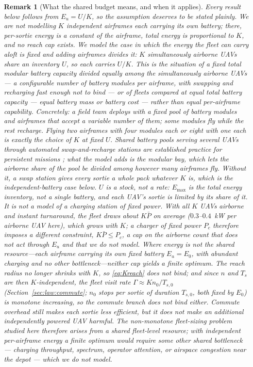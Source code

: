 \documentclass[journal,outdir=./]{IEEEtran}
\newtheorem{remark}{Remark}
\newcommand{\Pbar}{\bar{P}}
\newcommand{\Emax}{E_{\max}}
\newcommand{\Eu}{E_{u}}
\newcommand{\Gam}{\Gamma}
\begin{document}
\begin{remark}[What the shared budget means, and when it applies]\label{rem:budget}
Every result below follows from $\Eu=U/K$, so the assumption deserves to be stated plainly. We are \emph{not} modelling $K$ independent airframes each carrying its own battery; there, per-sortie energy is a constant of the airframe, total energy is proportional to $K$, and no reach cap exists. We model the case in which the energy the fleet can carry aloft is fixed and adding airframes divides it: $K$ simultaneously airborne UAVs share an inventory $U$, so each carries $U/K$. This is the situation of a fixed total \emph{modular} battery capacity divided equally among the simultaneously airborne UAVs --- a configurable number of battery modules per airframe, with swapping and recharging fast enough not to bind --- or of fleets compared at equal total battery capacity --- equal battery mass or battery cost --- rather than equal per-airframe capability. Concretely: a field team deploys with a fixed pool of battery modules and airframes that accept a variable number of them; some modules fly while the rest recharge. Flying two airframes with four modules each or eight with one each is exactly the choice of $K$ at fixed $U$. Shared battery pools serving several UAVs through automated swap-and-recharge stations are established practice for persistent missions \cite{toksoz2011swap,suzuki2012battery}; what the model adds is the modular bay, which lets the airborne share of the pool be divided among however many airframes fly. Without it, a swap station gives every sortie a whole pack whatever $K$ is, which is the independent-battery case below. $U$ is a stock, not a rate: $\Emax$ is the total energy inventory, not a single battery, and each UAV's sortie is limited by its share of it. It is \emph{not} a model of a charging station of fixed power. With all $K$ UAVs airborne and instant turnaround, the fleet draws about $K\Pbar$ on average ($0.3$--$0.4$~kW per airborne UAV here), which grows with $K$; a charger of fixed power $P_c$ therefore imposes a different constraint, $K\Pbar\le P_c$, a cap on the airborne count that does not act through $\Eu$ and that we do not model. Where energy is not the shared resource---each airframe carrying its own fixed battery $\Eu=E_0$, with abundant charging and no other bottleneck---\emph{neither} cap yields a finite optimum. The reach radius no longer shrinks with $K$, so \eqref{eq:Kreach} does not bind; and since $n$ and $T_s$ are then $K$-independent, the fleet visit rate $\Gam\approx Kn_0/T_{s,0}$ (Section~\ref{sec:law:commute}; $n_0$ stops per sortie of duration $T_{s,0}$, both fixed by $E_0$) is monotone increasing, so the commute branch does not bind either. Commute overhead still makes each sortie less efficient, but it does not make an additional independently powered UAV harmful. The non-monotone fleet-sizing problem studied here therefore arises from a shared fleet-level resource; with independent per-airframe energy a finite optimum would require some other shared bottleneck --- charging throughput, spectrum, operator attention, or airspace congestion near the depot --- which we do not model.


\end{remark}
\end{document}
